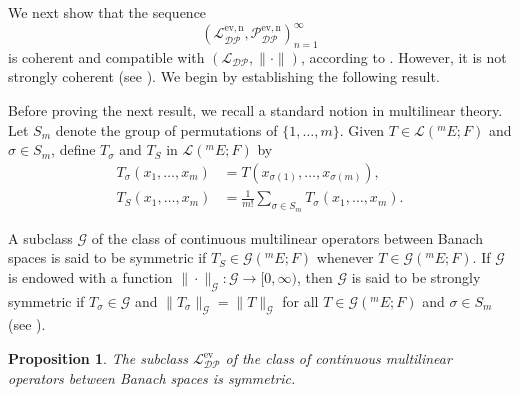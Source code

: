 \documentclass[12 pt]{article}%
\newtheorem{proposition}[theorem]{Proposition}
\newtheorem{final remark}[theorem]{Final Remark}
\begin{document}
We next show that the sequence
\begin{equation*}
	\left(\mathcal{L_{DP}^{\mathrm{ev,n}}}, \mathcal{P_{DP}^{\mathrm{ev,n}}} \right)_{n=1}^{\infty}
\end{equation*}
is coherent and compatible with $(\mathcal{L_{DP}}, \|\cdot\|)$, according to \cite{PR14}. However, it is not strongly coherent (see \cite{RST22}). We begin by establishing the following result.

Before proving the next result, we recall a standard notion in multilinear theory. Let $S_m$ denote the group of permutations of $\{1,\dots,m\}$. Given $T \in \mathcal{L}(^mE;F)$ and $\sigma \in S_m$, define $T_{\sigma}$ and $T_S$ in $\mathcal{L}(^mE;F)$ by
\begin{align*}
	T_{\sigma}(x_1,\dots,x_m) &= T(x_{\sigma(1)},\dots,x_{\sigma(m)}),\\
	T_S(x_1,\dots,x_m) &= \frac{1}{m!}\sum_{\sigma \in S_m} T_{\sigma}(x_1,\dots,x_m).
\end{align*}

A subclass $\mathcal{G}$ of the class of continuous multilinear operators between Banach spaces is said to be symmetric if $T_S \in \mathcal{G}(^mE;F)$ whenever $T \in \mathcal{G}(^mE;F)$. If $\mathcal{G}$ is endowed with a function $\|\cdot\|_{\mathcal{G}}\colon \mathcal{G} \to [0,\infty)$, then $\mathcal{G}$ is said to be strongly symmetric if $T_{\sigma} \in \mathcal{G}$ and $\|T_{\sigma}\|_{\mathcal{G}} = \|T\|_{\mathcal{G}}$ for all $T \in \mathcal{G}(^mE;F)$ and $\sigma \in S_m$ (see \cite{FG03}).

\begin{proposition}\label{DPS}
	The subclass $\mathcal{L_{DP}^{\mathrm{ev}}}$ of the class of continuous multilinear operators between Banach spaces is symmetric.
\end{proposition}
 
\end{document}
